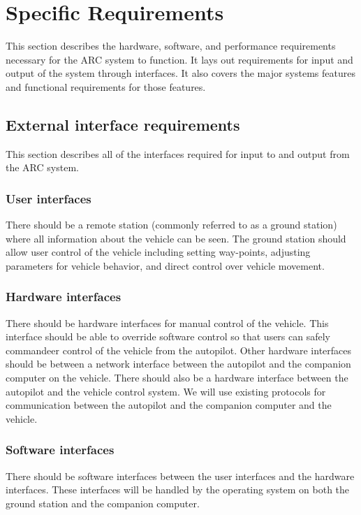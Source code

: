 \documentclass[compsoc,draftclsnofoot,onecolumn,10pt]{IEEEtran}
\begin{document}
\section{Specific Requirements} %
This section describes the hardware, software, and performance requirements
necessary for the ARC system to function. It lays out requirements for
input and output of the system through interfaces. It also covers the major
systems features and functional requirements for those features.

\subsection{External interface requirements}
This section describes all of the interfaces required for input to and output
from the ARC system.
	\subsubsection{User interfaces}
	There should be a remote station (commonly referred to as a ground station) where all information about the vehicle can be seen.
	The ground station should allow user control of the vehicle including setting way-points, adjusting parameters for vehicle behavior, and direct control over vehicle movement.
	
	\subsubsection{Hardware interfaces}
	There should be hardware interfaces for manual control of the vehicle. 
	This interface should be able to override software control so that users can safely commandeer control of the vehicle from the autopilot. 
	Other hardware interfaces should be between a network interface between the autopilot and the companion computer on the vehicle.
	There should also be a hardware interface between the autopilot and the vehicle control system.
	We will use existing protocols for communication between the autopilot and the companion computer and the vehicle.

	\subsubsection{Software interfaces}
	There should be software interfaces between the user interfaces and the hardware interfaces. These interfaces will be handled by the operating system on both the ground station and the companion computer.
\end{document}
